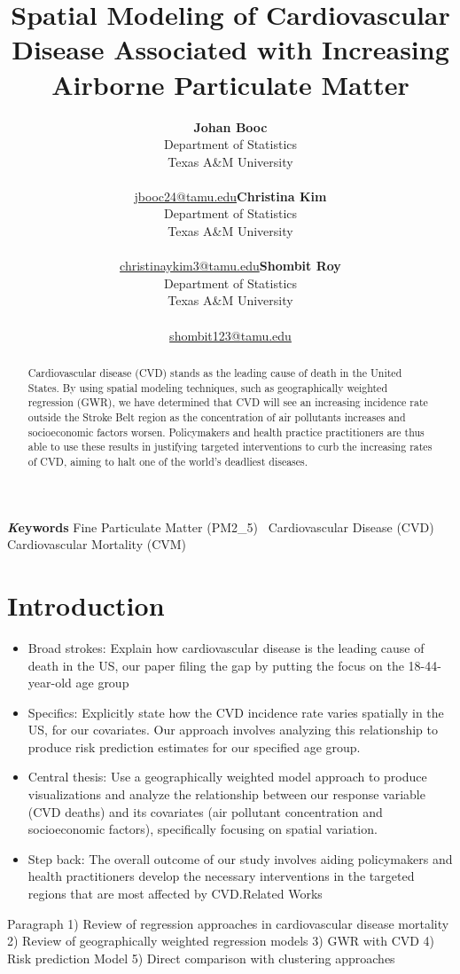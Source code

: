 \documentclass[
]{article}
\title{Spatial Modeling of Cardiovascular Disease Associated with
Increasing Airborne Particulate Matter}
\author{\textbf{Johan Booc}\\Department of Statistics\\Texas A\&M
University\\\\\href{mailto:jbooc24@tamu.edu}{jbooc24@tamu.edu}\asep\textbf{Christina
Kim}\\Department of Statistics\\Texas A\&M
University\\\\\href{mailto:christinaykim3@tamu.edu}{christinaykim3@tamu.edu}\asep\textbf{Shombit
Roy}\\Department of Statistics\\Texas A\&M
University\\\\\href{mailto:shombit123@tamu.edu}{shombit123@tamu.edu}}
\date{}
\begin{document}
\maketitle
\begin{abstract}
Cardiovascular disease (CVD) stands as the leading cause of death in the
United States. By using spatial modeling techniques, such as
geographically weighted regression (GWR), we have determined that CVD
will see an increasing incidence rate outside the Stroke Belt region as
the concentration of air pollutants increases and socioeconomic factors
worsen. Policymakers and health practice practitioners are thus able to
use these results in justifying targeted interventions to curb the
increasing rates of CVD, aiming to halt one of the world's deadliest
diseases.
\end{abstract}
{\bfseries \emph Keywords}
\def\sep{\textbullet\ }
Fine Particulate Matter (PM2\_5) \sep Cardiovascular Disease (CVD) \sep 
Cardiovascular Mortality (CVM)


\section{Introduction}\label{sec-intro}

\begin{itemize}
\item
  Broad strokes: Explain how cardiovascular disease is the leading cause
  of death in the US, our paper filing the gap by putting the focus on
  the 18-44-year-old age group~
\item
  Specifics: Explicitly state how the CVD incidence rate varies
  spatially in the US, for our covariates. Our approach involves
  analyzing this relationship to produce risk prediction estimates for
  our specified age group.~
\item
  Central thesis: Use a geographically weighted model approach to
  produce visualizations and analyze the relationship between our
  response variable (CVD deaths) and its covariates (air pollutant
  concentration and socioeconomic factors), specifically focusing on
  spatial variation.~
\item
  Step back: The overall outcome of our study involves aiding
  policymakers and health practitioners develop the necessary
  interventions in the targeted regions that are most affected by
  CVD.Related Works
\end{itemize}

Paragraph 1) Review of regression approaches in cardiovascular disease
mortality 2) Review of geographically weighted regression models 3) GWR
with CVD 4) Risk prediction Model 5) Direct comparison with clustering
approaches
\end{document}
